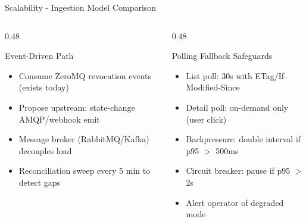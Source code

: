 \begin{frame}{Scalability - Ingestion Model Comparison}
  \begin{columns}[T]
    \begin{column}{0.48\textwidth}
      \begin{alertblock}{Event-Driven Path}
        \scriptsize
        \begin{itemize}
          \setlength{\itemsep}{0pt}
          \item Consume ZeroMQ revocation events (exists today)
          \item Propose upstream: state-change AMQP/webhook emit
          \item Message broker (RabbitMQ/Kafka) decouples load
          \item Reconciliation sweep every 5 min to detect gaps
        \end{itemize}
      \end{alertblock}
    \end{column}
    \begin{column}{0.48\textwidth}
      \begin{exampleblock}{Polling Fallback Safeguards}
        \scriptsize
        \begin{itemize}
          \setlength{\itemsep}{0pt}
          \item List poll: 30s with ETag/If-Modified-Since
          \item Detail poll: on-demand only (user click)
          \item Backpressure: double interval if p95 $>$ 500ms
          \item Circuit breaker: pause if p95 $>$ 2s
          \item Alert operator of degraded mode
        \end{itemize}
      \end{exampleblock}
    \end{column}
  \end{columns}
\end{frame}

